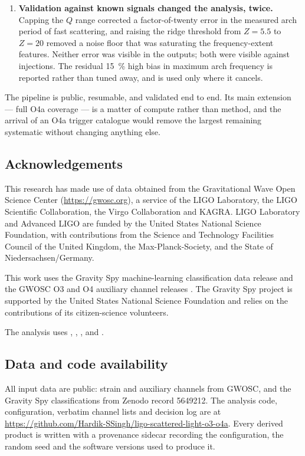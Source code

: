 \begin{enumerate}
\item \textbf{Validation against known signals changed the analysis, twice.}
Capping the $Q$ range corrected a factor-of-twenty error in the measured arch
period of fast scattering, and raising the ridge threshold from $Z = 5.5$ to
$Z = 20$ removed a noise floor that was saturating the frequency-extent
features. Neither error was visible in the outputs; both were visible against
injections. The residual \SI{15}{\percent} high bias in maximum arch frequency
is reported rather than tuned away, and is used only where it cancels.

\end{enumerate}

The pipeline is public, resumable, and validated end to end. Its main
extension --- full O4a coverage --- is a matter of compute rather than method,
and the arrival of an O4a trigger catalogue would remove the largest remaining
systematic without changing anything else.

\subsection*{Acknowledgements}

This research has made use of data obtained from the Gravitational Wave Open
Science Center (\url{https://gwosc.org}), a service of the LIGO Laboratory, the
LIGO Scientific Collaboration, the Virgo Collaboration and KAGRA. LIGO
Laboratory and Advanced LIGO are funded by the United States National Science
Foundation, with contributions from the Science and Technology Facilities
Council of the United Kingdom, the Max-Planck-Society, and the State of
Niedersachsen/Germany.

This work uses the Gravity Spy machine-learning classification data release
\citep{GravitySpyData2021} and the GWOSC O3 and O4 auxiliary channel releases
\citep{GWOSCO3Aux,GWOSCO4Aux}. The Gravity Spy project is supported by the
United States National Science Foundation and relies on the contributions of
its citizen-science volunteers.

The analysis uses  \citep{Macleod2021GWpy}, 
\citep{Harris2020NumPy},  \citep{Virtanen2020SciPy},
 \citep{Pedregosa2011} and 
\citep{Hunter2007}.

\subsection*{Data and code availability}

All input data are public: strain and auxiliary channels from GWOSC, and the
Gravity Spy classifications from Zenodo record 5649212. The analysis code,
configuration, verbatim channel lists and decision log are at
\url{https://github.com/Hardik-SSingh/ligo-scattered-light-o3-o4a}. Every derived
product is written with a provenance sidecar recording the configuration, the
random seed and the software versions used to produce it.
